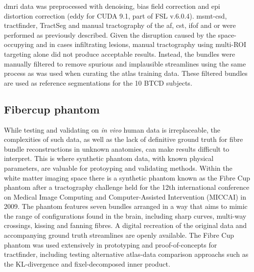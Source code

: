 \gls{dmri} data was preprocessed with denoising, bias field correction and \gls{epi} distortion correction (eddy for CUDA 9.1, part of FSL v.6.0.4).
\gls{msmt}-\gls{csd}, tractfinder, TractSeg and manual tractography of the \gls{af}, \gls{cst}, \gls{ifof} and \gls{or} were performed as previously described.
Given the disruption caused by the space-occupying and in cases infiltrating lesions, manual tractography using multi-ROI targeting alone did not produce acceptable results.
Instead, the bundles were manually filtered to remove spurious and implausible streamlines using the same process as was used when curating the atlas training data.
These filtered bundles are used as reference segmentations for the 10 BTCD subjects.

\subsection{Fibercup phantom}

While testing and validating on \textit{in vivo} human data is irreplaceable, the complexities of such data, as well as the lack of definitive ground truth for fibre bundle reconstructions in unknown anatomies, can make results difficult to interpret.
This is where synthetic phantom data, with known physical parameters, are valuable for protoyping and validating methods.
Within the white matter imaging space there is a synthetic phantom known as the Fibre Cup phantom after a tractography challenge held for the 12th international conference on Medical Image Computing and Computer-Assisted Intervention (MICCAI) in 2009.\autocite{Fillard2011}
The phantom features seven bundles arranged in a way that aims to mimic the range of configurations found in the brain, including sharp curves, multi-way crossings, kissing and fanning fibres.
A digital recreation of the original data and accompanying ground truth streamlines are openly available.\autocite{NITRC}
The Fibre Cup phantom was used extensively in prototyping and proof-of-concepts for tractfinder, including testing alternative atlas-data comparison approachs such as the KL-divergence and fixel-decomposed inner product.
